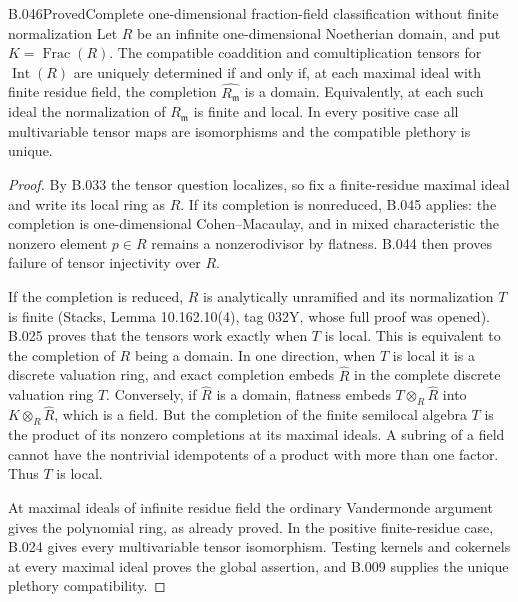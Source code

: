 \begin{saresult}{B.046}{Proved}{Complete one-dimensional fraction-field classification without finite normalization}
Let $R$ be an infinite one-dimensional Noetherian domain,
and put $K=\operatorname{Frac}(R)$.
The compatible coaddition and comultiplication tensors for
$\operatorname{Int}(R)$ are uniquely determined if and only
if, at each maximal ideal with finite residue field,
the completion $\widehat{R_{\mathfrak m}}$ is a domain.
Equivalently, at each such ideal the normalization of
$R_{\mathfrak m}$ is finite and local. In every positive
case all multivariable tensor maps are isomorphisms and
the compatible plethory is unique.
\end{saresult}
\begin{proof}
By B.033 the tensor question localizes, so fix a
finite-residue maximal ideal and write its local ring
as $R$. If its completion is nonreduced, B.045 applies:
the completion is one-dimensional Cohen--Macaulay, and
in mixed characteristic the nonzero element $p\in R$
remains a nonzerodivisor by flatness. B.044 then proves
failure of tensor injectivity over $R$.

If the completion is reduced, $R$ is analytically
unramified and its normalization $T$ is finite
(Stacks, Lemma 10.162.10(4), tag 032Y, whose full proof
was opened). B.025 proves that the tensors work exactly
when $T$ is local. This is equivalent to the completion
of $R$ being a domain. In one direction, when $T$ is
local it is a discrete valuation ring, and exact
completion embeds $\widehat R$ in the complete discrete
valuation ring $\widehat T$. Conversely, if
$\widehat R$ is a domain, flatness embeds
$T\otimes_R\widehat R$ into
$K\otimes_R\widehat R$, which is a field. But the
completion of the finite semilocal algebra $T$ is the
product of its nonzero completions at its maximal
ideals. A subring of a field cannot have the nontrivial
idempotents of a product with more than one factor.
Thus $T$ is local.

At maximal ideals of infinite residue field the ordinary
Vandermonde argument gives the polynomial ring, as
already proved. In the positive finite-residue case,
B.024 gives every multivariable tensor isomorphism.
Testing kernels and cokernels at every maximal ideal
proves the global assertion, and B.009 supplies the
unique plethory compatibility.
\end{proof}
